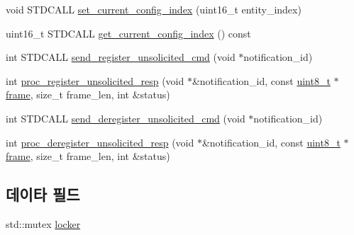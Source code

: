 \begin{DoxyCompactItemize}
void S\+T\+D\+C\+A\+LL \hyperlink{classavdecc__lib_1_1end__station__imp_a527759deb541e560780b32f7015ebdce}{set\+\_\+current\+\_\+config\+\_\+index} (uint16\+\_\+t entity\+\_\+index)
\item 
uint16\+\_\+t S\+T\+D\+C\+A\+LL \hyperlink{classavdecc__lib_1_1end__station__imp_aa3fdfe3755dd961f0f24aa72463878c8}{get\+\_\+current\+\_\+config\+\_\+index} () const 
\item 
int S\+T\+D\+C\+A\+LL \hyperlink{classavdecc__lib_1_1end__station__imp_a96179747fc48b01a3ac76a3559fcd81a}{send\+\_\+register\+\_\+unsolicited\+\_\+cmd} (void $\ast$notification\+\_\+id)
\item 
int \hyperlink{classavdecc__lib_1_1end__station__imp_a151a0d143ccb4f721fb4e89bb25ab049}{proc\+\_\+register\+\_\+unsolicited\+\_\+resp} (void $\ast$\&notification\+\_\+id, const \hyperlink{stdint_8h_aba7bc1797add20fe3efdf37ced1182c5}{uint8\+\_\+t} $\ast$\hyperlink{gst__avb__playbin_8c_ac8e710e0b5e994c0545d75d69868c6f0}{frame}, size\+\_\+t frame\+\_\+len, int \&status)
\item 
int S\+T\+D\+C\+A\+LL \hyperlink{classavdecc__lib_1_1end__station__imp_ab260b2e1b3440be44cf0a44bc7e5400e}{send\+\_\+deregister\+\_\+unsolicited\+\_\+cmd} (void $\ast$notification\+\_\+id)
\item 
int \hyperlink{classavdecc__lib_1_1end__station__imp_a2427c30c802be85e96e3b36489dd1353}{proc\+\_\+deregister\+\_\+unsolicited\+\_\+resp} (void $\ast$\&notification\+\_\+id, const \hyperlink{stdint_8h_aba7bc1797add20fe3efdf37ced1182c5}{uint8\+\_\+t} $\ast$\hyperlink{gst__avb__playbin_8c_ac8e710e0b5e994c0545d75d69868c6f0}{frame}, size\+\_\+t frame\+\_\+len, int \&status)
\end{DoxyCompactItemize}
\subsection*{데이타 필드}
\begin{DoxyCompactItemize}
\item 
std\+::mutex \hyperlink{classavdecc__lib_1_1end__station__imp_a2207f93fef130266b292686bf96ef8d3}{locker}
\end{DoxyCompactItemize}
